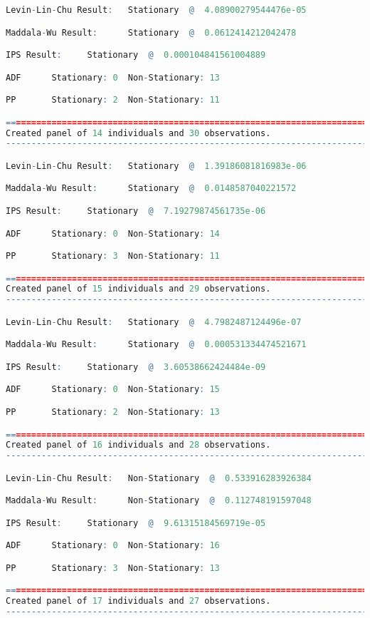 \begin{lstlisting}[language=R]
Levin-Lin-Chu Result:   Stationary  @  4.08900279544476e-05

Maddala-Wu Result:      Stationary  @  0.0612414212042478

IPS Result:     Stationary  @  0.000104841561004889

ADF      Stationary: 0  Non-Stationary: 13

PP       Stationary: 2  Non-Stationary: 11

=========================================================================
Created panel of 14 individuals and 30 observations.
-------------------------------------------------------------------------

Levin-Lin-Chu Result:   Stationary  @  1.39186081816983e-06

Maddala-Wu Result:      Stationary  @  0.0148587040221572

IPS Result:     Stationary  @  7.19279874561735e-06

ADF      Stationary: 0  Non-Stationary: 14

PP       Stationary: 3  Non-Stationary: 11

=========================================================================
Created panel of 15 individuals and 29 observations.
-------------------------------------------------------------------------

Levin-Lin-Chu Result:   Stationary  @  4.7982487124496e-07

Maddala-Wu Result:      Stationary  @  0.000531334474521671

IPS Result:     Stationary  @  3.60538662424484e-09

ADF      Stationary: 0  Non-Stationary: 15

PP       Stationary: 2  Non-Stationary: 13

=========================================================================
Created panel of 16 individuals and 28 observations.
-------------------------------------------------------------------------

Levin-Lin-Chu Result:   Non-Stationary  @  0.533916283926384

Maddala-Wu Result:      Non-Stationary  @  0.112748191597048

IPS Result:     Stationary  @  9.61315184569719e-05

ADF      Stationary: 0  Non-Stationary: 16

PP       Stationary: 3  Non-Stationary: 13

=========================================================================
Created panel of 17 individuals and 27 observations.
-------------------------------------------------------------------------


\end{lstlisting}
